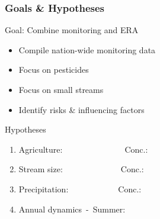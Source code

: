 \documentclass[
	12pt
	]{beamer}
\begin{document}
\begin{frame}
\frametitle{Goals \& Hypotheses}
	\begin{exampleblock}{Goal: Combine monitoring and ERA}
		\begin{itemize}
			\item Compile nation-wide monitoring data %
			\item Focus on pesticides
			\item Focus on small streams
			\item Identify risks \& influencing factors
		\end{itemize}
	\end{exampleblock}
	\pause
	\begin{exampleblock}{Hypotheses}
		\begin{enumerate}
			\item Agriculture:~~~~~\textbf{\Large\textuparrow}~~~~~~~~~~Conc.: \textbf{\Large\textuparrow}
			\pause
			\item Stream size:~~~~\textbf{\Large\textdownarrow}~~~~~~~~~~Conc.: \textbf{\Large\textuparrow}
			\pause
			\item Precipitation:~~\textbf{\Large\textuparrow}~~~~~~~~~~Conc.: \textbf{\Large\textuparrow}
			\pause
			\item Annual dynamics~-~Summer: \textbf{\Large\textuparrow}
		\end{enumerate}
	\end{exampleblock}
\end{frame}
\end{document}
